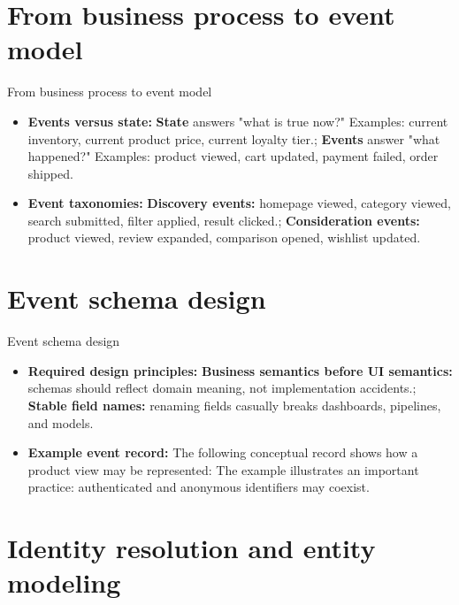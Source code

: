 \documentclass[aspectratio=169]{beamer}
\begin{document}
\section{From business process to event model}

\begin{frame}{From business process to event model}
  \begin{itemize}
    \item \textbf{Events versus state:} \textbf{State} answers "what is true now?" Examples: current inventory, current product price, current loyalty tier.; \textbf{Events} answer "what happened?" Examples: product viewed, cart updated, payment failed, order shipped.
    \item \textbf{Event taxonomies:} \textbf{Discovery events:} homepage viewed, category viewed, search submitted, filter applied, result clicked.; \textbf{Consideration events:} product viewed, review expanded, comparison opened, wishlist updated.
  \end{itemize}
\end{frame}

\section{Event schema design}

\begin{frame}{Event schema design}
  \begin{itemize}
    \item \textbf{Required design principles:} \textbf{Business semantics before UI semantics:} schemas should reflect domain meaning, not implementation accidents.; \textbf{Stable field names:} renaming fields casually breaks dashboards, pipelines, and models.
    \item \textbf{Example event record:} The following conceptual record shows how a product view may be represented: The example illustrates an important practice: authenticated and anonymous identifiers may coexist.
  \end{itemize}
\end{frame}

\section{Identity resolution and entity modeling}
\end{document}
